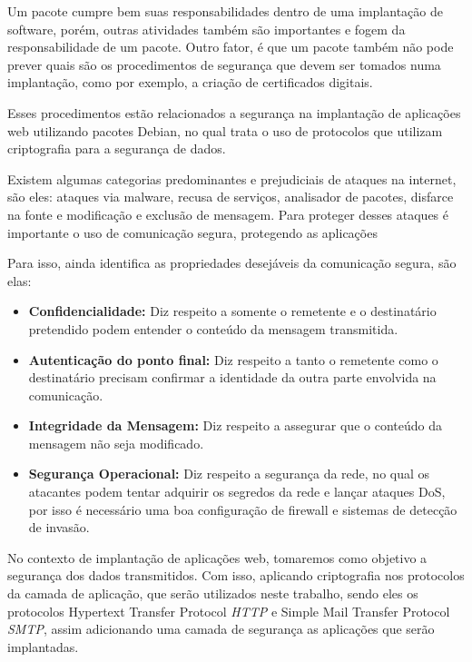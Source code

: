 Um pacote cumpre bem suas responsabilidades dentro de uma implantação de
software, porém, outras atividades também são importantes e fogem da responsabilidade 
de um pacote. Outro fator, é que um pacote também não pode prever quais são
os procedimentos de segurança que devem ser tomados numa implantação, como por 
exemplo, a criação de certificados digitais. 

Esses procedimentos estão relacionados a segurança na implantação de aplicações web 
utilizando pacotes Debian, no qual trata o uso de protocolos que utilizam criptografia
para a segurança de dados.

Existem algumas categorias predominantes e prejudiciais de ataques na internet, 
são eles: ataques via malware, recusa de serviços, analisador
de pacotes, disfarce na fonte e modificação e exclusão de mensagem. Para proteger
desses ataques é importante o uso de comunicação segura, protegendo as aplicações 
\cite{kurose2010redes} 

Para isso,  ainda identifica as propriedades 
desejáveis da comunicação segura, são elas:

\begin{itemize}
  \item \textbf{Confidencialidade:} Diz respeito a somente o remetente e o destinatário
  pretendido podem entender o conteúdo da mensagem transmitida.
  \item \textbf{Autenticação do ponto final:} Diz respeito a tanto o remetente como o destinatário
  precisam confirmar a identidade da outra parte envolvida na comunicação.
  \item \textbf{Integridade da Mensagem:} Diz respeito a assegurar que o conteúdo
  da mensagem não seja modificado.
  \item \textbf{Segurança Operacional:} Diz respeito a segurança da rede, no qual
  os atacantes podem tentar adquirir os segredos da rede e lançar ataques DoS,
  por isso é necessário uma boa configuração de firewall e sistemas de detecção
  de invasão.
\end{itemize}

No contexto de implantação de aplicações web, tomaremos como objetivo a segurança
dos dados transmitidos. Com isso, aplicando criptografia nos protocolos da camada
de aplicação, que serão utilizados neste trabalho, sendo eles os protocolos 
Hypertext Transfer Protocol \textit{HTTP} e Simple Mail Transfer Protocol 
\textit{SMTP}, assim adicionando uma camada de segurança as aplicações que serão implantadas.

